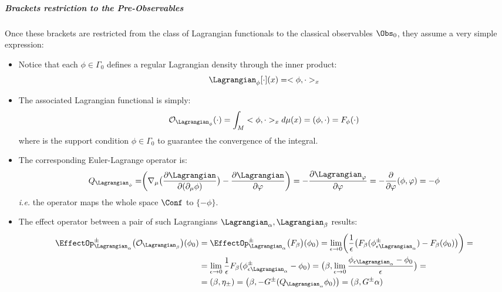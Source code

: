 \documentclass[Main]{subfiles}
\begin{document}
			\subparagraph{Brackets restriction to the Pre-Observables}
				Once these brackets are restricted from the class of Lagrangian functionals to the classical observables $\Obs_0$, they assume a very simple expression:
				\begin{itemize}
					\item Notice that each $\phi \in \Gamma_0$ defines a regular Lagrangian density through the inner product:
						\begin{displaymath}
							\Lagrangian_\phi[\cdot](x) = <\phi, \cdot>_x
						\end{displaymath}
					\item The associated Lagrangian functional is simply:
						\begin{displaymath}
							\mathcal{O}_{\Lagrangian_\phi} (\cdot ) = \int_M  <\phi, \cdot>_x d\mu(x) = (\phi, \cdot) = F_\phi (\cdot)
						\end{displaymath}
						where is the support condition $\phi \in \Gamma_0$ to guarantee the convergence of the integral.
					\item The corresponding Euler-Lagrange operator is:
						\begin{displaymath}
							Q_{\Lagrangian_\phi}= \biggr( \nabla_\mu \big( \frac{\partial \Lagrangian}{\partial ( \partial_\mu \phi)} \big) - \frac{\partial \Lagrangian}{\partial \varphi} \biggr) = - \frac{\partial \Lagrangian_\varphi}{\partial \varphi} = -\frac{\partial}{\partial \varphi} (\phi, \varphi) = -\phi
						\end{displaymath}
						\textit{i.e.} the operator maps the whole space $\Conf$ to $\{-\phi \}$.
					\item The effect operator between a pair of such Lagrangians $\Lagrangian_\alpha, \Lagrangian_\beta$ results:
						\begin{align}
						\EffectOp_{\Lagrangian_\alpha}^\pm \big( \mathcal{O}_{\Lagrangian_\beta} \big) (\phi_0) &= \EffectOp_{\Lagrangian_\alpha}^\pm \big( F_\beta  \big) (\phi_0) = \lim_{\epsilon \rightarrow 0} \biggr( \frac{1}{\epsilon}\big(F_\beta ( \phi_{\epsilon \Lagrangian_\alpha}^\pm) - F_\beta(\phi_0) \big) \biggr) = 
						\nonumber\\
							&= \lim_{\epsilon \rightarrow 0} \frac{1}{\epsilon}F_\beta( \phi_{\epsilon \Lagrangian_\alpha}^\pm - \phi_0) =
							\big(\beta, \lim_{\epsilon\rightarrow 0} \frac{ \phi_{\epsilon \Lagrangian_\alpha}  - \phi_0}{\epsilon} \big) = 
							\nonumber\\
							&=(\beta, \eta_\pm) = \big( \beta, - G^\pm (Q_{\Lagrangian_\alpha} \phi_0 ) \big) = ( \beta, G^\pm \alpha)

\end{align}
\end{itemize}
\end{document}
